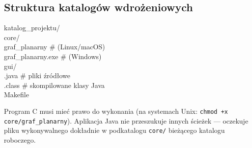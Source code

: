 \documentclass[a4paper, 11pt]{article}
\begin{document}
\subsection{Struktura katalogów wdrożeniowych}

\begin{filebox}
katalog\_projektu/\\
\quad core/\\
\quad \quad graf\_planarny \quad\# (Linux/macOS)\\
\quad \quad graf\_planarny.exe \quad\# (Windows)\\
\quad gui/\\
\quad \quad *.java \quad\# pliki źródłowe\\
\quad \quad *.class \quad\# skompilowane klasy Java\\
\quad Makefile
\end{filebox}

Program C musi mieć prawo do wykonania (na systemach Unix:
\texttt{chmod +x core/graf\_planarny}). Aplikacja Java nie przeszukuje
innych ścieżek --- oczekuje pliku wykonywalnego dokładnie w podkatalogu
\texttt{core/} bieżącego katalogu roboczego.
\end{document}

